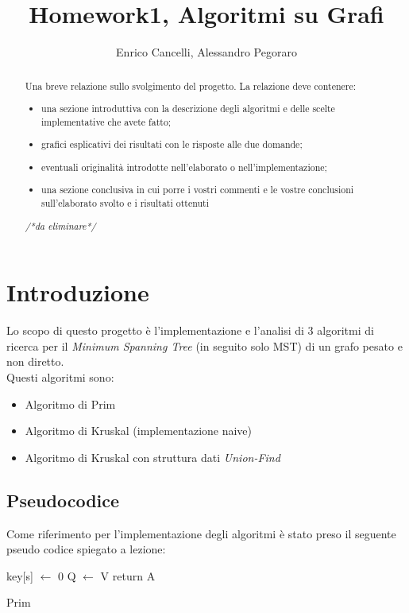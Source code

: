 \documentclass[]{article}
\title{Homework1, Algoritmi su Grafi}
\author{Enrico Cancelli, Alessandro Pegoraro}
\begin{document}
\maketitle

\begin{abstract}
	Una breve relazione sullo svolgimento del progetto. La relazione deve contenere:
	\begin{itemize}
		\item una sezione introduttiva con la descrizione degli algoritmi e delle scelte implementative che avete fatto;
		\item grafici esplicativi dei risultati con le risposte alle due domande;
		\item eventuali originalità introdotte nell'elaborato o nell'implementazione;
		\item una sezione conclusiva in cui porre i vostri commenti e le vostre conclusioni sull'elaborato svolto e i risultati ottenuti
	\end{itemize}
	\textit{/*da eliminare*/}
\end{abstract}

\section{Introduzione}
Lo scopo di questo progetto è l'implementazione e l'analisi di 3 algoritmi di ricerca per il \textit{Minimum Spanning Tree} (in seguito solo MST) di un grafo pesato e non diretto.\\
Questi algoritmi sono:
\begin{itemize}
	\item Algoritmo di Prim
	\item Algoritmo di Kruskal (implementazione naive)
	\item Algoritmo di Kruskal con struttura dati \textit{Union-Find}
\end{itemize}
\subsection{Pseudocodice}
Come riferimento per l'implementazione degli algoritmi è stato preso il seguente pseudo codice spiegato a lezione:\\
\begin{algorithm}[H]
	\SetAlgoLined
	\DontPrintSemicolon
	key[s] $\gets$ 0\;
	Q $\gets$ V\;
	return A\;
	\caption{Prim}
\end{algorithm}
\end{document}
